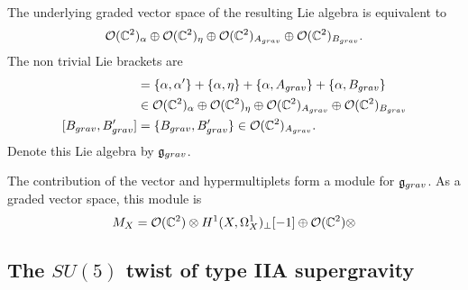 The underlying graded vector space of the resulting Lie algebra is equivalent to
\[
\mathcal O(\mathbb C^2)_\alpha \oplus \mathcal O(\mathbb C^2)_\eta \oplus \mathcal O(\mathbb C^2)_{A_{grav}} \oplus \mathcal O(\mathbb C^2)_{B_{grav}} .
\]
The non trivial Lie brackets are
\begin{align*}
[\alpha, \alpha' + \eta + A_{grav} + B_{grav}] & = \{\alpha,  \alpha'\} + \{\alpha, \eta\} + \{\alpha, A_{grav}\} + \{\alpha, B_{grav}\} \\ & \in \cO(\CC^2)_\alpha \oplus \cO(\CC^2)_\eta \oplus \cO(\CC^2)_{A_{grav}} \oplus \cO(\CC^2)_{B_{grav}} \\
[B_{grav}, B'_{grav}] & = \{B_{grav}, B'_{grav}\} \in \cO(\CC^2)_{A_{grav}} .
\end{align*}
Denote this Lie algebra by $\mathfrak g_{grav}$. 

The contribution of the vector and hypermultiplets form a module for $\mathfrak g_{grav}$. 
As a graded vector space, this module is
\[
M_X = \mathcal O(\mathbb C^2) \otimes H^{1}(X, \Omega^1_X)_\perp [-1] \oplus \mathcal O(\mathbb C^2) \otimes 
\]


\subsection{The $SU(5)$ twist of type IIA supergravity}
